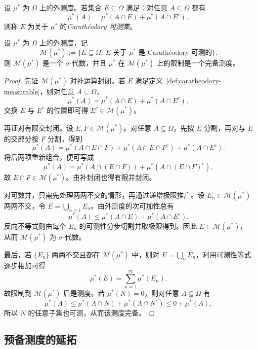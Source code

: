 \begin{definition}\label{def:caratheodory-measurable}
设 $\mu^\ast$ 为 $\Omega$ 上的外测度。若集合 $E\subseteq \Omega$ 满足：对任意 $A\subseteq \Omega$ 都有
\[
\mu^\ast(A)=\mu^\ast(A\cap E)+\mu^\ast(A\cap E^c),
\]
则称 $E$ 为关于 $\mu^\ast$ 的\emph{Carathéodory 可测集}。
\end{definition}

\begin{theorem}\label{thm:caratheodory-measurable-sets}
设 $\mu^\ast$ 为 $\Omega$ 上的外测度，记
\[
\mathscr M(\mu^\ast):=\{E\subseteq \Omega:\ E\text{ 关于 }\mu^\ast\text{ 是 Carathéodory 可测的}\}.
\]
则 $\mathscr M(\mu^\ast)$ 是一个 $\sigma$-代数，并且 $\mu^\ast$ 在 $\mathscr M(\mu^\ast)$ 上的限制是一个完备测度。
\end{theorem}

\begin{proof}
先证 $\mathscr M(\mu^\ast)$ 对补运算封闭。若 $E$ 满足定义~\ref{def:caratheodory-measurable}，则对任意 $A\subseteq \Omega$，
\[
\mu^\ast(A)=\mu^\ast(A\cap E)+\mu^\ast(A\cap E^c),
\]
交换 $E$ 与 $E^c$ 的位置即可得 $E^c\in \mathscr M(\mu^\ast)$。

再证对有限交封闭。设 $E,F\in \mathscr M(\mu^\ast)$。对任意 $A\subseteq \Omega$，先按 $E$ 分割，再对与 $E$ 的交部分按 $F$ 分割，得到
\[
\mu^\ast(A)=\mu^\ast(A\cap E\cap F)+\mu^\ast(A\cap E\cap F^c)+\mu^\ast(A\cap E^c).
\]
将后两项重新组合，便可写成
\[
\mu^\ast(A)=\mu^\ast(A\cap (E\cap F))+\mu^\ast(A\cap (E\cap F)^c),
\]
故 $E\cap F\in \mathscr M(\mu^\ast)$。由补封闭也得有限并封闭。

对可数并，只需先处理两两不交的情形，再通过递增极限推广。设 $E_n\in \mathscr M(\mu^\ast)$ 两两不交，令 $E=\bigcup_{n\ge1}E_n$。由外测度的次可加性总有
\[
\mu^\ast(A)\le \mu^\ast(A\cap E)+\mu^\ast(A\cap E^c).
\]
反向不等式则由每个 $E_n$ 的可测性分步切割并取极限得到。因此 $E\in \mathscr M(\mu^\ast)$，从而 $\mathscr M(\mu^\ast)$ 为 $\sigma$-代数。

最后，若 $\{E_n\}$ 两两不交且都在 $\mathscr M(\mu^\ast)$ 中，则对 $E=\bigcup_n E_n$，利用可测性等式逐步相加可得
\[
\mu^\ast(E)=\sum_{n=1}^{\infty}\mu^\ast(E_n).
\]
故限制到 $\mathscr M(\mu^\ast)$ 后是测度。若 $\mu^\ast(N)=0$，则对任意 $A\subseteq\Omega$ 有
\[
\mu^\ast(A)\le \mu^\ast(A\cap N)+\mu^\ast(A\cap N^c)\le 0+\mu^\ast(A),
\]
所以 $N$ 的任意子集也可测，从而该测度完备。
\end{proof}

\subsection{预备测度的延拓}

